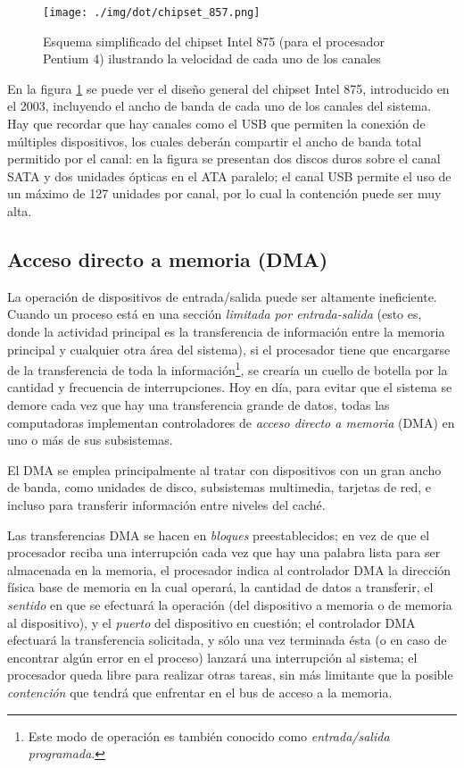 \documentclass[11pt,fleqn]{book} %
\begin{document}
\begin{figure}[htb]
\centering
\texttt{[image: ./img/dot/chipset\_857.png]}
\caption{\label{HW_chipset_857}Esquema simplificado del chipset Intel 875 (para el procesador Pentium 4) ilustrando la velocidad de cada uno de los canales}
\end{figure}

En la figura \ref{HW_chipset_857} se puede ver el diseño general del
chipset Intel 875, introducido en el 2003, incluyendo el ancho de
banda de cada uno de los canales del sistema. Hay que recordar que hay
canales como el USB que permiten la conexión de múltiples
dispositivos, los cuales deberán compartir el ancho de banda total
permitido por el canal: en la figura se presentan dos discos duros
sobre el canal SATA y dos unidades ópticas en el ATA paralelo; el
canal USB permite el uso de un máximo de 127 unidades por canal, por
lo cual la contención puede ser muy alta.
\subsection{Acceso directo a memoria (DMA)}
\label{sec-2-6-2}
\label{HW_dma}


La operación de dispositivos de entrada/salida puede ser altamente
ineficiente. Cuando un proceso está en una sección \emph{limitada por entrada-salida} (esto es, donde la actividad principal es la
transferencia de información entre la memoria principal y cualquier
otra área del sistema), si el procesador tiene que encargarse de la
transferencia de toda la información\footnote{Este modo de operación es
también conocido como \emph{entrada/salida programada}. }, se crearía un
cuello de botella por la cantidad y frecuencia de interrupciones. Hoy
en día, para evitar que el sistema se demore cada vez que hay una
transferencia grande de datos, todas las computadoras implementan
controladores de \emph{acceso directo a memoria} (DMA) en uno o más de sus
subsistemas.

El DMA se emplea principalmente al tratar con dispositivos con un
gran ancho de banda, como unidades de disco, subsistemas multimedia,
tarjetas de red, e incluso para transferir información entre niveles
del caché.

Las transferencias DMA se hacen en \emph{bloques} preestablecidos; en vez
de que el procesador reciba una interrupción cada vez que hay una palabra
lista para ser almacenada en la memoria, el procesador indica al
controlador DMA la dirección física base de memoria en la cual
operará, la cantidad de datos a transferir, el \emph{sentido} en que se
efectuará la operación (del dispositivo a memoria o de memoria al
dispositivo), y el \emph{puerto} del dispositivo en cuestión; el
controlador DMA efectuará la transferencia solicitada, y sólo una vez
terminada ésta (o en caso de encontrar algún error en el proceso)
lanzará una interrupción al sistema; el procesador queda libre para
realizar otras tareas, sin más limitante que la posible \emph{contención}
que tendrá que enfrentar en el bus de acceso a la memoria.
\end{document}
